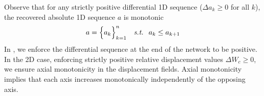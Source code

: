 \documentclass[acmtog,timestamp]{acmart}%
\begin{document}
Observe that for any strictly positive differential 1D sequence ($\Delta a_k \geq 0$ for all $k$), the recovered absolute 1D sequence $a$ is monotonic
\begin{equation}
a   = \Big\{ a_k \Big\}_{k=1}^n \quad \text{\textit{s.t.}  } \; a_k \leq a_{k+1}
\label{eq:cumsum_mono}
\end{equation}%
In \ourmethod{}, we enforce the differential sequence at the end of the network to be positive. In the 2D case, enforcing strictly positive relative displacement values $\Delta W_c \geq 0$, we ensure axial monotonicity in the displacement fields. Axial monotonicity implies that each axis increases monotonically independently of the opposing axis.
\end{document}
